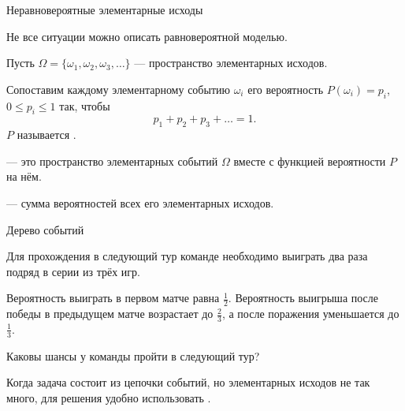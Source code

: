 \begin{frame}{Неравновероятные элементарные исходы}

Не все ситуации можно описать равновероятной моделью.

Пусть $\Omega=\{ \omega_1,\omega_2, \omega_3,\ldots \}$ --- пространство элементарных исходов.

Сопоставим каждому элементарному событию $\omega_i$ его вероятность $P(\omega_i)=p_i$, $0\leqslant p_i\leqslant 1$ так, чтобы 
$$p_1+p_2+p_3+\ldots=1.$$
 $P$ называется .

 {} --- это пространство элементарных событий $\Omega$ вместе с функцией вероятности $P$ на нём.

 {} --- сумма вероятностей всех его элементарных исходов.

\end{frame}

\begin{frame}{Дерево событий}

\exmpl Для прохождения в следующий тур команде необходимо выиграть два раза подряд в серии из трёх игр.

Вероятность выиграть в первом матче равна $\frac 12$. Вероятность выигрыша после победы в предыдущем матче возрастает до $\frac 23$, а после поражения уменьшается до $\frac 13$.

Каковы шансы у команды пройти в следующий тур?

Когда задача состоит из цепочки событий, но элементарных исходов не так много, для решения удобно использовать .

\end{frame}

